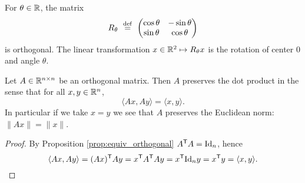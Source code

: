\documentclass[11pt,nocut]{article}
\begin{document}
\begin{example}
	For $\theta \in \mathbb{R}$, the matrix
	$$
	R_{\theta} \ \overset{\rm def}{=} \
	\begin{pmatrix}
		\cos \theta & - \sin \theta \\
		\sin \theta & \cos \theta
	\end{pmatrix}
	$$
	is orthogonal. The linear transformation $x \in \mathbb{R}^2 \mapsto R_{\theta} x$ is the rotation of center $0$ and angle $\theta$. 
\end{example}

\begin{proposition}
	Let $A \in \mathbb{R}^{n \times n}$ be an orthogonal matrix. Then $A$ preserves the dot product in the sense that for all $x,y \in \mathbb{R}^n$,
	$$
	\langle Ax, Ay \rangle = \langle x,y\rangle.
	$$
	In particular if we take $x=y$ we see that $A$ preserves the Euclidean norm: $\|Ax\| = \|x\|$.
\end{proposition}
\begin{proof}
	By Proposition \ref{prop:equiv_orthogonal} $A^{{\sf T}} A = {{\rm Id}}_n$, hence
	$$
	\langle Ax, Ay \rangle 
	=
	(Ax)^{{\sf T}} Ay = x^{{\sf T}} A^{{\sf T}} A y = x^{{\sf T}} {{\rm Id}}_n y = x^{{\sf T}} y = \langle x,y\rangle.
	$$
\end{proof}





\vspace{1cm}
\centerline{}

%
%
\end{document}
